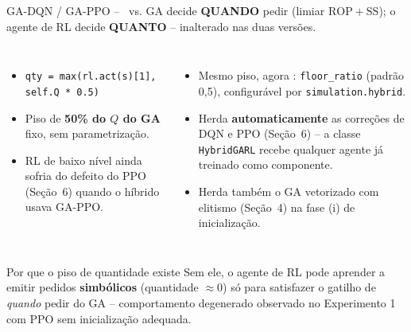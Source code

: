\begin{frame}{GA-DQN / GA-PPO -- \antes\ vs. \depois}
  \small GA decide \textbf{QUANDO} pedir (limiar $\mathrm{ROP}{+}\mathrm{SS}$); o agente de RL decide \textbf{QUANTO} -- inalterado nas duas versões.
  \vspace{0.4em}

  \begin{columns}[T,onlytextwidth]
      \antes
      \begin{itemize}\footnotesize
        \item \texttt{qty = max(rl.act(s)[1], self.Q * 0.5)}
        \item Piso de \textbf{50\% do $Q$ do GA} fixo, sem parametrização.
        \item RL de baixo nível ainda sofria do defeito do PPO
          (Seção~6) quando o híbrido usava GA-PPO.
      \end{itemize}
      \depois
      \begin{itemize}\footnotesize
        \item Mesmo piso, agora :
          \texttt{floor\_ratio} (padrão 0,5), configurável por
          \texttt{simulation.hybrid}.
        \item Herda \textbf{automaticamente} as correções de DQN e PPO
          (Seção~6) -- a classe \texttt{HybridGARL} recebe qualquer agente
          já treinado como componente.
        \item Herda também o GA vetorizado com elitismo (Seção~4) na fase
          (i) de inicialização.
      \end{itemize}
  \end{columns}
  \vspace{0.8em}

  \begin{alertblock}{Por que o piso de quantidade existe}
    \small Sem ele, o agente de RL pode aprender a emitir pedidos
    \textbf{simbólicos} (quantidade $\approx0$) só para satisfazer o
    gatilho de \textit{quando} pedir do GA -- comportamento degenerado
    observado no Experimento 1 com PPO sem inicialização adequada.
  \end{alertblock}

\end{frame}
